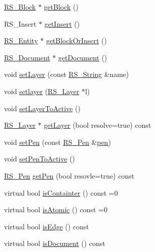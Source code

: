 \begin{DoxyCompactItemize}
\item 
\hyperlink{class_r_s___block}{R\-S\-\_\-\-Block} $\ast$ \hyperlink{class_r_s___entity_a7ed1ea7893bce9a62a703abe705a4c92}{get\-Block} ()
\item 
R\-S\-\_\-\-Insert $\ast$ \hyperlink{class_r_s___entity_ae2bbb36bc11bdbbd3d95902b4d6ef552}{get\-Insert} ()
\item 
\hyperlink{class_r_s___entity}{R\-S\-\_\-\-Entity} $\ast$ \hyperlink{class_r_s___entity_a089deabcb9d0dc0e3632a840fc257b4f}{get\-Block\-Or\-Insert} ()
\item 
\hyperlink{class_r_s___document}{R\-S\-\_\-\-Document} $\ast$ \hyperlink{class_r_s___entity_ad7a8374dd9a69d9ef4f82e0a931c59be}{get\-Document} ()
\item 
void \hyperlink{class_r_s___entity_ab37a566f71a185962c09b4688c21fdd9}{set\-Layer} (const \hyperlink{rs__string_8h_a5adec11f318c2ae2ecdc6fe2b03be9fa}{R\-S\-\_\-\-String} \&name)
\item 
void \hyperlink{class_r_s___entity_a4d4a70eedefd0b32ceb0c42354753961}{setlayer} (\hyperlink{class_r_s___layer}{R\-S\-\_\-\-Layer} $\ast$l)
\item 
void \hyperlink{class_r_s___entity_a3dc27731d7d66aeddb837b25bfb51e71}{set\-Layer\-To\-Active} ()
\item 
\hyperlink{class_r_s___layer}{R\-S\-\_\-\-Layer} $\ast$ \hyperlink{class_r_s___entity_a4ffbd375773a8987d973c9836581c437}{get\-Layer} (bool resolve=true) const 
\item 
void \hyperlink{class_r_s___entity_a65fa57c0bc0d422d555315a1610af19a}{set\-Pen} (const \hyperlink{class_r_s___pen}{R\-S\-\_\-\-Pen} \&\hyperlink{class_r_s___entity_a9651a97a17dda8a5d2706e50fcf8c6f7}{pen})
\item 
void \hyperlink{class_r_s___entity_af2a01a8dc3c6a2e3c23beb78e6c33dea}{set\-Pen\-To\-Active} ()
\item 
\hyperlink{class_r_s___pen}{R\-S\-\_\-\-Pen} \hyperlink{class_r_s___entity_a9046490e0b05ed7b73f88abc0cc66f95}{get\-Pen} (bool resovle=true) const 
\item 
virtual bool \hyperlink{class_r_s___entity_ab6674236cb31e22053da2b3010cef688}{is\-Containter} () const =0
\item 
virtual bool \hyperlink{class_r_s___entity_a3918893713669c92ed54ba327d31bfef}{is\-Atomic} () const =0
\item 
virtual bool \hyperlink{class_r_s___entity_aa71d0c049265021ac9b1e42ad20f3a74}{is\-Edge} () const 
\item 
virtual bool \hyperlink{class_r_s___entity_a707a0ce416c9321d20005409e476f7da}{is\-Document} () const 

\end{DoxyCompactItemize}
